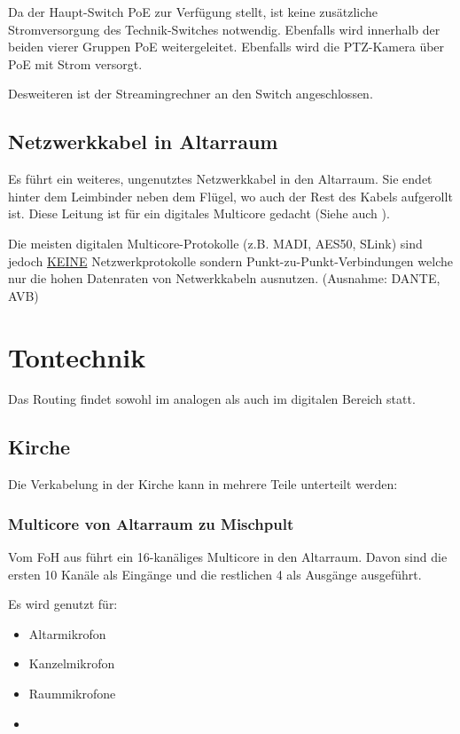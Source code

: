 		Da der Haupt-Switch \Gls{PoE} zur Verfügung stellt, ist keine zusätzliche Stromversorgung des Technik-Switches notwendig.
		Ebenfalls wird innerhalb der beiden vierer Gruppen \Gls{PoE} weitergeleitet.
		Ebenfalls wird die \Gls{PTZ-Kamera} über \Gls{PoE} mit Strom versorgt.

		Desweiteren ist der Streamingrechner an den Switch angeschlossen.

		\subsection{Netzwerkkabel in Altarraum}
			Es führt ein weiteres, ungenutztes Netzwerkkabel in den Altarraum.
			Sie endet hinter dem Leimbinder neben dem Flügel, wo auch der Rest des Kabels aufgerollt ist.
			Diese Leitung ist für ein digitales \Gls{Multicore} gedacht (Siehe auch ).
			
			Die meisten digitalen \Gls{Multicore}-Protokolle (z.B. \Gls{MADI}, \Gls{AES50}, SLink) sind jedoch \underline{KEINE} Netzwerkprotokolle sondern Punkt-zu-Punkt-Verbindungen welche nur die hohen Datenraten von Netwerkkabeln ausnutzen. (Ausnahme: \Gls{DANTE}, AVB)
	\section{Tontechnik}
		Das \Gls{Routing} findet sowohl im analogen als auch im digitalen Bereich statt.
		\subsection{Kirche}
			Die Verkabelung in der Kirche kann in mehrere Teile unterteilt werden:
			\subsubsection{Multicore von Altarraum zu Mischpult}
				Vom \Gls{FoH} aus führt ein 16-kanäliges \Gls{Multicore} in den Altarraum.
				Davon sind die ersten 10 Kanäle als Eingänge und die restlichen 4 als Ausgänge ausgeführt.

				Es wird genutzt für:
				\begin{itemize}
					\item Altarmikrofon
					\item Kanzelmikrofon
					\item Raummikrofone
					\item {}
				\end{itemize}
